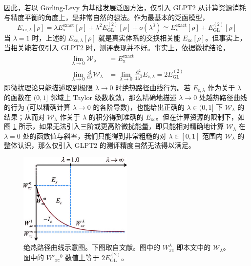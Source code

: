 因此，若以 G\"orling-Levy 为基础发展泛函方法，仅引入 GLPT2 从计算资源消耗与精度平衡的角度上，是非常自然的想法。作为最基本的泛函模型，
\begin{equation}
  E_{\mathrm{xc}, \lambda} [\rho] = \lambda E_\mathrm{x}^\mathrm{exact}[\rho] + \lambda^2 E_\mathrm{GL}^{(2)} [\rho] + o(\lambda^3) \simeq E_\mathrm{x}^\mathrm{exact}[\rho] + E_\mathrm{GL}^{(2)} [\rho]
\end{equation}
当 $\lambda = 1$ 时，上述的 $E_{\mathrm{xc}, \lambda} [\rho]$ 就是真实体系的交换相关能 $E_{\mathrm{xc}} [\rho]$。但事实上，当相关能若仅引入 GLPT2 时，测评表现并不好\cite{Su-Xu.JCP.2014}。事实上，依据微扰结论，
\begin{align}
  \lim_{\lambda \rightarrow 0} \mathcal{W}_{\lambda} &= E_\mathrm{x}^\mathrm{exact} \\
  \lim_{\lambda \rightarrow 0} \frac{\mathrm{d}}{\mathrm{d} \lambda} \mathcal{W}_{\lambda} &= \lim_{\lambda \rightarrow 0} \frac{\mathrm{d}^2}{\mathrm{d} \lambda^2} E_{\mathrm{c}, \lambda} = 2 E_\mathrm{GL}^{(2)}
\end{align}
即微扰理论只能描述取到极限 $\lambda \rightarrow 0$ 时绝热路径曲线行为。若 $E_{\mathrm{c}, \lambda}$ 作为关于 $\lambda$ 的函数在 $(0, 1]$ 邻域上 Taylor 级数收敛，那么精确地描述 $\lambda \rightarrow 0$ 处越热路径曲线的行为 (可以精确计算 $\lambda \rightarrow 0$ 的各阶导数)，也能给出正确的 $\lambda \in (0, 1]$ 下 $\mathcal{W}_{\lambda}$ 的结果；从而对 $\mathcal{W}_{\lambda}$ 作关于 $\lambda$ 的积分得到准确的 $E_\mathrm{xc}$。但在计算资源的限制下，如图 \ref{fig.adiabatic-curve} 所示，如果无法引入三阶或更高阶微扰能量，即只能相对精确地计算 $\mathcal{W}_{\lambda}$ 在 $\lambda = 0$ 处的函数值与斜率，我们只能得到非常粗糙的对 $\lambda \in [0, 1]$ 范围内 $\mathcal{W}_{\lambda}$ 的整体认识，那么仅引入 GLPT2 的测评精度自然无法得以满足。

\begin{figure}[h]
  \centering
  \caption{绝热路径曲线示意图。下图取自文献\cite{Su-Xu.JCP.2014}。图中的 $W_{xc}^{\lambda}$ 即本文中的 $\mathcal{W}_{\lambda}$。图中的 $W'_{xc}{}^{0}$ 数值上等于 $2 E_\mathrm{GL}^{(2)}$。}
  \label{fig.adiabatic-curve}
  \includegraphics[width=0.5\textwidth]{assets/adiabatic-curve.jpg}
\end{figure}

